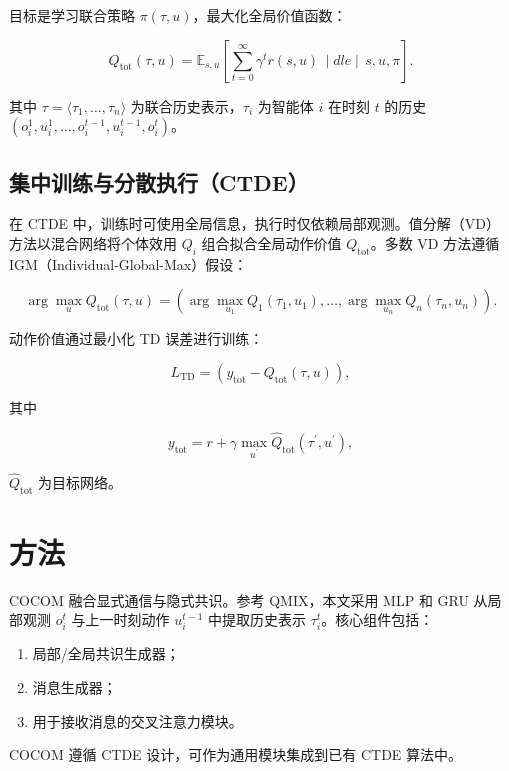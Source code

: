 目标是学习联合策略 $\pi(\tau,u)$，最大化全局价值函数：

\[
Q_{\text{tot}}(\tau,u)=\mathbb{E}_{s,u}\!\left[\sum_{t=0}^{\infty}\gamma^t r(s,u)\,\mid dle\mid \,s,u,\pi\right].
\]

其中 $\tau=\langle\tau_1,\ldots,\tau_n\rangle$ 为联合历史表示，$\tau_i$ 为智能体 $i$ 在时刻 $t$ 的历史 $(o_i^1,u_i^1,\ldots,o_i^{t-1},u_i^{t-1},o_i^t)$。

\subsection*{集中训练与分散执行（CTDE）}

在 CTDE 中，训练时可使用全局信息，执行时仅依赖局部观测。值分解（VD）方法以混合网络将个体效用 $Q_i$ 组合拟合全局动作价值 $Q_{\text{tot}}$。多数 VD 方法遵循 IGM（Individual-Global-Max）假设：

\begin{equation}
\arg\max_{u}Q_{\text{tot}}(\tau,u)
=
\left(
\arg\max_{u_1}Q_1(\tau_1,u_1),\ldots,\arg\max_{u_n}Q_n(\tau_n,u_n)
\right).
\tag{1}
\end{equation}

动作价值通过最小化 TD 误差进行训练：

\begin{equation}
L_{\text{TD}}=\left(y_{\text{tot}}-Q_{\text{tot}}(\tau,u)\right),
\tag{2}
\end{equation}

其中

\[
y_{\text{tot}}=r+\gamma\max_{u^{\prime}}\hat{Q}_{\text{tot}}(\tau^{\prime},u^{\prime}),
\]

$\hat{Q}_{\text{tot}}$ 为目标网络。

\section*{方法}

COCOM 融合显式通信与隐式共识。参考 QMIX，本文采用 MLP 和 GRU 从局部观测 $o_i^t$ 与上一时刻动作 $u_i^{t-1}$ 中提取历史表示 $\tau_i^t$。核心组件包括：

\begin{enumerate}
    \item 局部/全局共识生成器；
    \item 消息生成器；
    \item 用于接收消息的交叉注意力模块。
\end{enumerate}

COCOM 遵循 CTDE 设计，可作为通用模块集成到已有 CTDE 算法中。

